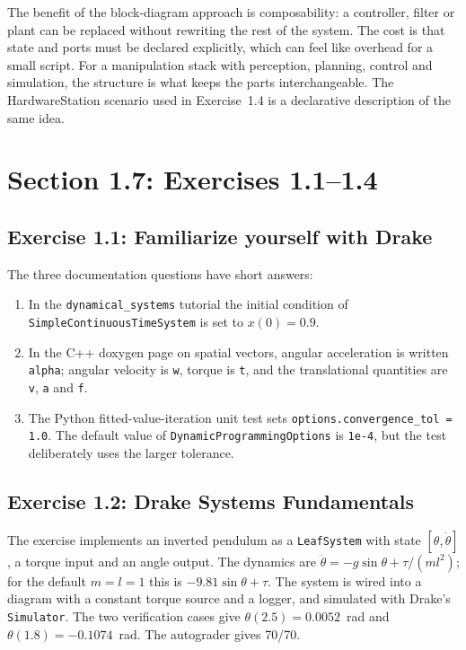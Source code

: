 \documentclass[11pt]{report}
\begin{document}
The benefit of the block-diagram approach is composability: a controller,
filter or plant can be replaced without rewriting the rest of the system.  The
cost is that state and ports must be declared explicitly, which can feel like
overhead for a small script.  For a manipulation stack with perception,
planning, control and simulation, the structure is what keeps the parts
interchangeable.  The HardwareStation scenario used in Exercise~1.4 is a
declarative description of the same idea.

\section{Section 1.7: Exercises 1.1--1.4}
\label{sec:s17}

\subsection{Exercise 1.1: Familiarize yourself with Drake}
The three documentation questions have short answers:
\begin{enumerate}[leftmargin=1.4em,itemsep=2pt]
  \item In the \texttt{dynamical\_systems} tutorial \cite{drake-tutorials} the initial condition of
        \texttt{SimpleContinuousTimeSystem} is set to $x(0)=0.9$.
  \item In the C++ doxygen page on spatial vectors, angular acceleration is
        written \texttt{alpha}; angular velocity is \texttt{w}, torque is
        \texttt{t}, and the translational quantities are \texttt{v},
        \texttt{a} and \texttt{f}.
  \item The Python fitted-value-iteration unit test sets
        \texttt{options.convergence\_tol = 1.0}.  The default value of
        \texttt{DynamicProgrammingOptions} is \texttt{1e-4}, but the test
        deliberately uses the larger tolerance.
\end{enumerate}

\subsection{Exercise 1.2: Drake Systems Fundamentals}
The exercise implements an inverted pendulum as a \texttt{LeafSystem} with
state $[\theta,\dot\theta]$, a torque input and an angle output.  The dynamics
are $\ddot\theta=-g\sin\theta+\tau/(ml^2)$; for the default $m=l=1$ this is
$-9.81\sin\theta+\tau$.  The system is wired into a diagram with a constant
torque source and a logger, and simulated with Drake's \texttt{Simulator}.  The
two verification cases give $\theta(2.5)=0.0052$~rad and
$\theta(1.8)=-0.1074$~rad.  The autograder gives 70/70.
\end{document}
